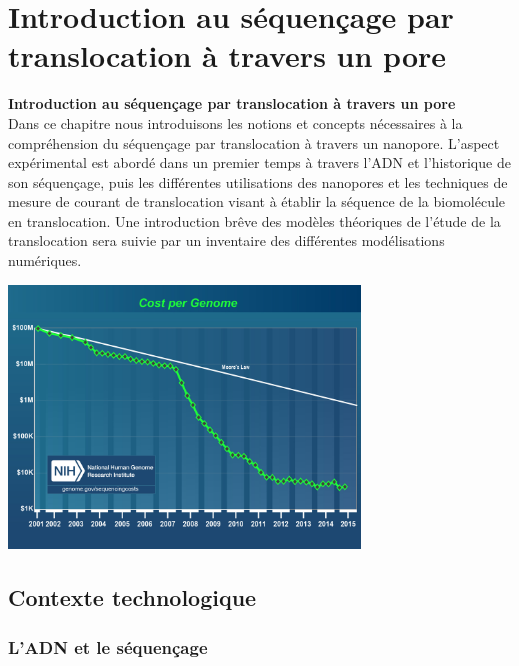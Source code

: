 
\chapter{Introduction au séquençage par translocation à travers un pore}
\label{intro}

\cleardoublepage

{\Large\textbf{{Introduction au séquençage par translocation à travers un pore}}}\\


\lettrine[loversize=0.6,lraise=0.1,findent=0.5em,nindent=0em]{D}{}ans ce chapitre nous introduisons les notions et  concepts nécessaires à la compréhension du séquençage par translocation à travers un nanopore. L'aspect expérimental est abordé dans un premier temps à travers l'ADN et l'historique de son séquençage, puis les différentes utilisations des nanopores et les techniques de mesure de courant de translocation visant à établir la séquence de la biomolécule en translocation. Une introduction br\^eve des modèles théoriques de l'étude de la translocation sera suivie par un inventaire des différentes modélisations numériques.

\minitoc

\begin{center}
\includegraphics[width=0.7\textwidth]{cost_genome.jpg}
\end{center}





\cleardoublepage




\section{Contexte technologique}

\subsection{L'ADN et le séquençage}

